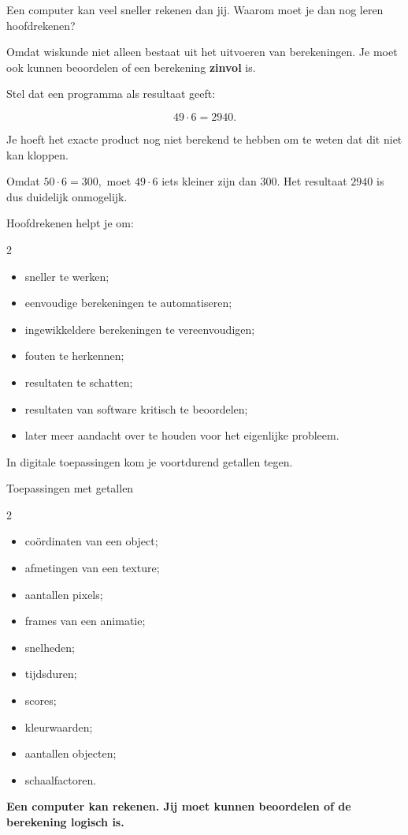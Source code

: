\documentclass{ximera}
\begin{document}


Een computer kan veel sneller rekenen dan jij. Waarom moet je dan nog leren hoofdrekenen?

Omdat wiskunde niet alleen bestaat uit het uitvoeren van berekeningen.
Je moet ook kunnen beoordelen of een berekening \textbf{zinvol} is.

Stel dat een programma als resultaat geeft:

\[
49\cdot6=2940.
\]

Je hoeft het exacte product nog niet berekend te hebben om te weten dat dit
niet kan kloppen.

Omdat
\(
50\cdot6=300,
\) moet
\(
49\cdot6
\) iets kleiner zijn dan \(300\). Het resultaat \(2940\) is dus duidelijk onmogelijk.

Hoofdrekenen helpt je om:
\begin{multicols}{2}
    \begin{itemize}
    \item sneller te werken;
    \item eenvoudige berekeningen te automatiseren;
    \item ingewikkeldere berekeningen te vereenvoudigen;
    \item fouten te herkennen;
    \item resultaten te schatten;
    \item resultaten van software kritisch te beoordelen;
    \item later meer aandacht over te houden voor het eigenlijke probleem.
\end{itemize}
\end{multicols}

In digitale toepassingen kom je voortdurend getallen tegen.

\begin{voorbeeld}{Toepassingen met getallen}
\begin{multicols}{2}
    \begin{itemize}
    \item coördinaten van een object;
    \item afmetingen van een texture;
    \item aantallen pixels;
    \item frames van een animatie;
    \item snelheden;
    \item tijdsduren;
    \item scores;
    \item kleurwaarden;
    \item aantallen objecten;
    \item schaalfactoren.
\end{itemize}
\end{multicols}

\end{voorbeeld}
\begin{center}
\textbf{Een computer kan rekenen. Jij moet kunnen beoordelen of de
berekening logisch is.}
\end{center}
\end{document}
